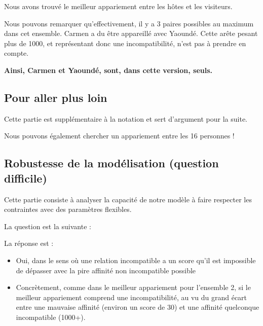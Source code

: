 \documentclass{mytex}
\begin{document}

Nous avons trouvé le meilleur appariement entre les hôtes et les visiteurs.


Nous pouvons remarquer qu'effectivement, il y a 3 paires possibles au maximum dans cet ensemble. Carmen a du être appareillé avec Yaoundé. Cette arête pesant plus de 1000, et représentant donc une incompatibilité, n'est pas à prendre en compte.

\textbf{Ainsi, Carmen et Yaoundé, sont, dans cette version, seuls.}

\subsection{Pour aller plus loin}

Cette partie est supplémentaire à la notation et sert d'argument pour la suite.

Nous pouvons également chercher un appariement entre les 16 personnes !



\subsection{Robustesse de la modélisation (question difficile)}

Cette partie consiste à analyser la capacité de notre modèle à faire respecter les contraintes avec des paramètres flexibles.

La question est la suivante :


La réponse est :

\begin{itemize}
    \item Oui, dans le sens où une relation incompatible a un score qu'il est impossible de dépasser avec la pire affinité non incompatible possible
    \item Concrètement, comme dans le meilleur appariement pour l'ensemble 2, si le meilleur appariement comprend une incompatibilité, au vu du grand écart entre une mauvaise affinité (environ un score de 30) et une affinité quelconque incompatible (1000+).
\end{itemize}
\end{document}
